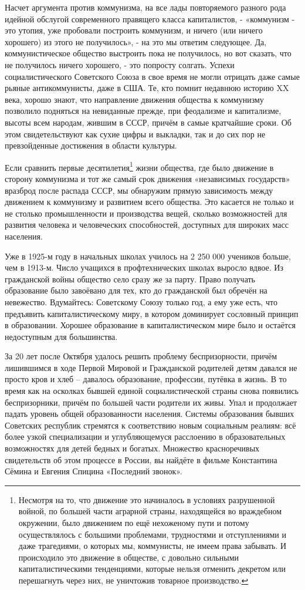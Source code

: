 \documentclass[../main]{subfiles}
\begin{document}
Насчет аргумента против коммунизма, на все лады повторяемого разного рода идейной обслугой современного правящего класса капиталистов, - «коммунизм - это утопия, уже пробовали построить коммунизм, и ничего (или ничего хорошего) из этого не получилось», - на это мы ответим следующее. Да, коммунистическое общество выстроить пока не получилось, но вот сказать, что не получилось ничего хорошего, - это попросту солгать. Успехи социалистического Советского Союза в свое время не могли отрицать даже самые рьяные антикоммунисты, даже в США. Те, кто помнит недавнюю историю XX века, хорошо знают, что направление движения общества к коммунизму позволило подняться на невиданные прежде, при феодализме и капитализме, высоты всем народам, жившим в СССР, причём в самые кратчайшие сроки. Об этом свидетельствуют как сухие цифры и выкладки, так и до сих пор не превзойденные достижения в области культуры.

Если сравнить первые десятилетия\footnote{Несмотря на то, что движение это начиналось в условиях разрушенной войной, по большей части аграрной страны, находящейся во враждебном окружении, было движением по ещё нехоженому пути и потому осуществлялось с большими проблемами, трудностями и отступлениями и даже трагедиями, о которых мы, коммунисты, не имеем права забывать. И происходило это движение в обществе, с довольно сильными капиталистическими тенденциями, которые нельзя отменить декретом или перешагнуть через них, не уничтожив товарное производство.} жизни общества, где было движение в сторону коммунизма и тот же самый срок движения «независимых государств» вразброд после распада СССР, мы обнаружим прямую зависимость между движением к коммунизму и развитием всего общества. Это касается не только и не столько промышленности и производства вещей, сколько возможностей для развития человека и человеческих способностей, доступных для широких масс населения.

Уже в 1925-м году в начальных школах училось на 2 250 000 учеников больше, чем в 1913-м. Число учащихся в профтехнических школах выросло вдвое. Из гражданской войны общество село сразу же за парту. Право получать образование было завоёвано для тех, кто до гражданской был обречён на невежество. Вдумайтесь: Советскому Союзу только год, а ему уже есть, что предъявить капиталистическому миру, в котором доминирует сословный принцип в образовании. Хорошее образование в капиталистическом мире было и остаётся недоступным для большинства.

За 20 лет после Октября удалось решить проблему беспризорности, причём лишившимся в ходе Первой Мировой и Гражданской родителей детям давался не просто кров и хлеб – давалось образование, профессии, путёвка в жизнь. В то время как на осколках бывшей единой социалистической страны снова появились беспризорники, причём по большей части родители их живы. Упал и продолжает падать уровень общей образованности населения. Системы образования бывших Советских республик стремятся к соответствию новым социальным реалиям: всё более узкой специализации и углубляющемуся расслоению в образовательных возможностях для детей бедных и богатых. Множество красноречивых свидетельств об этом процессе в России, вы найдёте в фильме Константина Сёмина и Евгения Спицина «Последний звонок».
\end{document}
